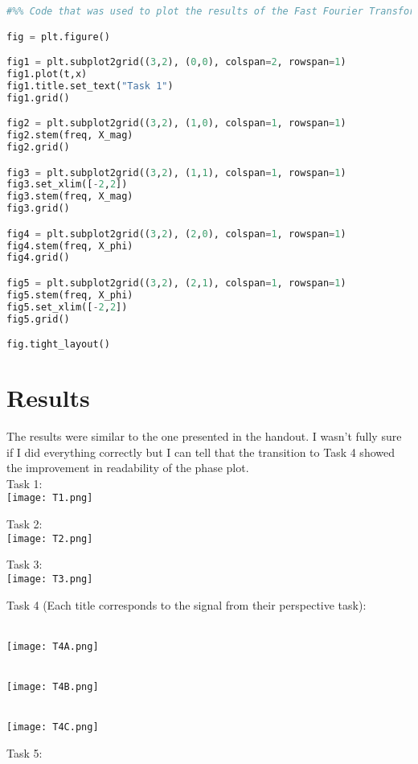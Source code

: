 \documentclass[12pt]{report}
\begin{document}
\begin{lstlisting}[language=Python]
#%% Code that was used to plot the results of the Fast Fourier Transform and their original signals resulting in one figure with 5 plots. Used for the different signals presented in this lab. 

fig = plt.figure()

fig1 = plt.subplot2grid((3,2), (0,0), colspan=2, rowspan=1)
fig1.plot(t,x)
fig1.title.set_text("Task 1")
fig1.grid()

fig2 = plt.subplot2grid((3,2), (1,0), colspan=1, rowspan=1)
fig2.stem(freq, X_mag)
fig2.grid()

fig3 = plt.subplot2grid((3,2), (1,1), colspan=1, rowspan=1)
fig3.set_xlim([-2,2])
fig3.stem(freq, X_mag)
fig3.grid()

fig4 = plt.subplot2grid((3,2), (2,0), colspan=1, rowspan=1)
fig4.stem(freq, X_phi)
fig4.grid()

fig5 = plt.subplot2grid((3,2), (2,1), colspan=1, rowspan=1)
fig5.stem(freq, X_phi)
fig5.set_xlim([-2,2])
fig5.grid()

fig.tight_layout()

\end{lstlisting}
\section{Results}

The results were similar to the one presented in the handout. I wasn't fully sure if I did everything correctly but I can tell that the transition to Task 4 showed the improvement in readability of the phase plot.
\\
Task 1:
\\ \texttt{[image: T1.png]}

Task 2:
\\ \texttt{[image: T2.png]}
\newpage

Task 3:
\\ \texttt{[image: T3.png]}

Task 4 (Each title corresponds to the signal from their perspective task):

\\ \texttt{[image: T4A.png]}

\\ \texttt{[image: T4B.png]}

\\ \texttt{[image: T4C.png]}

Task 5:
\end{document}
